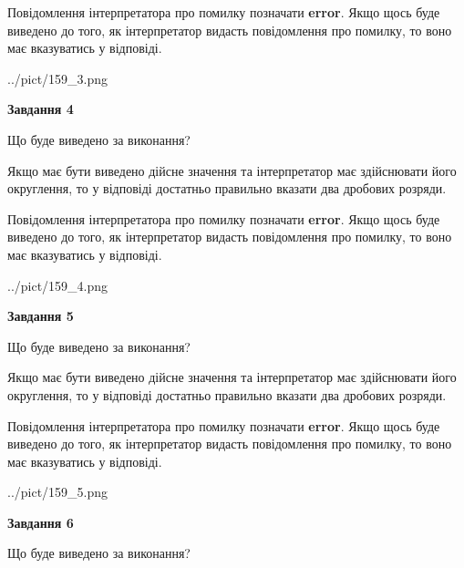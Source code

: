 \documentclass[12pt, ukrainian]{article}
\begin{document}
{\begin {Large}
Повідомлення інтерпретатора про помилку позначати \textbf{error}.
Якщо щось буде виведено до того, як інтерпретатор видасть повідомлення про помилку, 
то воно має вказуватись у відповіді. \par

\begin{center}
	{../pict/159_3.png}
\end{center}
\newpage

{\begin {center}\textbf{Завдання 4}\end {center}}\par
Що буде виведено за виконання? \par

Якщо має бути виведено дійсне значення та інтерпретатор має здійснювати його округлення, 
то у відповіді достатньо правильно вказати два дробових розряди.

Повідомлення інтерпретатора про помилку позначати \textbf{error}.
Якщо щось буде виведено до того, як інтерпретатор видасть повідомлення про помилку, 
то воно має вказуватись у відповіді. \par

\begin{center}
	{../pict/159_4.png}
\end{center}
\newpage

{\begin {center}\textbf{Завдання 5}\end {center}}\par
Що буде виведено за виконання? \par

Якщо має бути виведено дійсне значення та інтерпретатор має здійснювати його округлення, 
то у відповіді достатньо правильно вказати два дробових розряди.

Повідомлення інтерпретатора про помилку позначати \textbf{error}.
Якщо щось буде виведено до того, як інтерпретатор видасть повідомлення про помилку, 
то воно має вказуватись у відповіді. \par

\begin{center}
	{../pict/159_5.png}
\end{center}
\newpage

{\begin {center}\textbf{Завдання 6}\end {center}}\par
Що буде виведено за виконання? \par


\end{Large}}
\end{document}
